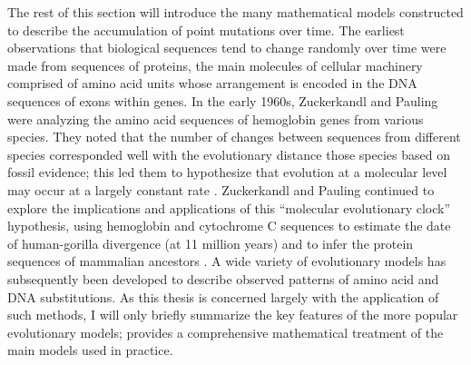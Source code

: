 The rest of this section will introduce the many mathematical models
constructed to describe the accumulation of point mutations over
time. The earliest observations that biological sequences tend to
change randomly over time were made from sequences of proteins, the
main molecules of cellular machinery comprised of amino acid units
whose arrangement is encoded in the DNA sequences of exons within
genes. In the early 1960s, Zuckerkandl and Pauling were analyzing the
amino acid sequences of hemoglobin genes from various species. They
noted that the number of changes between sequences from different
species corresponded well with the evolutionary distance those species
based on fossil evidence; this led them to hypothesize that evolution
at a molecular level may occur at a largely constant rate
\citep{Zuckerkandl1962,Morgan1998}. Zuckerkandl and Pauling continued
to explore the implications and applications of this ``molecular
evolutionary clock'' hypothesis, using hemoglobin and cytochrome C
sequences to estimate the date of human-gorilla divergence (at 11
million years) and to infer the protein sequences of mammalian
ancestors \citep{Zuckerkandl1965}. A wide variety of evolutionary
models has subsequently been developed to describe observed patterns
of amino acid and DNA substitutions. As this thesis is concerned
largely with the application of such methods, I will only briefly
summarize the key features of the more popular evolutionary models;
\citet{Yang2006} provides a comprehensive mathematical treatment of
the main models used in practice.

